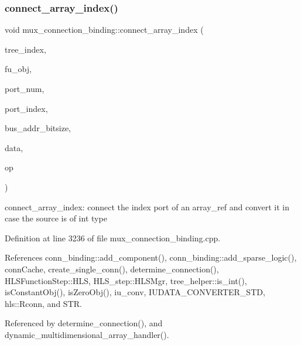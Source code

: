 \subsubsection{\texorpdfstring{connect\+\_\+array\+\_\+index()}{connect\_array\_index()}}
{\footnotesize\ttfamily void mux\+\_\+connection\+\_\+binding\+::connect\+\_\+array\+\_\+index (\begin{DoxyParamCaption}\item[{unsigned int}]{tree\+\_\+index,  }\item[{\hyperlink{generic__obj_8hpp_acb533b2ef8e0fe72e09a04d20904ca81}{generic\+\_\+obj\+Ref}}]{fu\+\_\+obj,  }\item[{unsigned int}]{port\+\_\+num,  }\item[{unsigned int}]{port\+\_\+index,  }\item[{unsigned int}]{bus\+\_\+addr\+\_\+bitsize,  }\item[{const \hyperlink{op__graph_8hpp_a9a0b240622c47584bee6951a6f5de746}{Op\+Graph\+Const\+Ref}}]{data,  }\item[{const \hyperlink{graph_8hpp_abefdcf0544e601805af44eca032cca14}{vertex} \&}]{op }\end{DoxyParamCaption})\hspace{0.3cm}{\ttfamily [private]}}



connect\+\_\+array\+\_\+index\+: connect the index port of an array\+\_\+ref and convert it in case the source is of int type 



Definition at line 3236 of file mux\+\_\+connection\+\_\+binding.\+cpp.



References conn\+\_\+binding\+::add\+\_\+component(), conn\+\_\+binding\+::add\+\_\+sparse\+\_\+logic(), conn\+Cache, create\+\_\+single\+\_\+conn(), determine\+\_\+connection(), H\+L\+S\+Function\+Step\+::\+H\+LS, H\+L\+S\+\_\+step\+::\+H\+L\+S\+Mgr, tree\+\_\+helper\+::is\+\_\+int(), is\+Constant\+Obj(), is\+Zero\+Obj(), iu\+\_\+conv, I\+U\+D\+A\+T\+A\+\_\+\+C\+O\+N\+V\+E\+R\+T\+E\+R\+\_\+\+S\+TD, hls\+::\+Rconn, and S\+TR.



Referenced by determine\+\_\+connection(), and dynamic\+\_\+multidimensional\+\_\+array\+\_\+handler().

